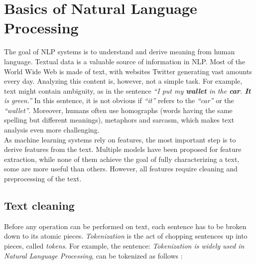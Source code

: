 \section{Basics of Natural Language Processing}
The goal of NLP systems is to understand and derive meaning from human language. Textual data is a valuable source of information in NLP.
Most of the World Wide Web is made of text, with websites  Twitter generating vast amounts every day. Analyzing this content is, however, not a simple task. For example, text might contain ambiguity, as in the sentence \emph{``I put my \textbf{wallet} in the  \textbf{car}.  \textbf{It} is green.''} In this sentence, it is not obvious if \emph{``it''} refers to the \emph{``car''} or the  \emph{``wallet''}. Moreover, humans often use homographs (words having the same spelling but different meanings), metaphors and sarcasm, which makes text analysis even more challenging.\\
As machine learning systems rely on features, the most important step is to derive features from the text. Multiple models have been proposed for feature extraction,  while none of them achieve the goal of fully characterizing a text, some are more useful than others.
%
However, all features require cleaning and preprocessing of the text. 


\subsection{Text cleaning }
Before any operation can be performed on text, each sentence has to be broken down to its atomic pieces. \emph{Tokenization} is the act of chopping sentences up into pieces, called \emph{tokens}.  For example, the sentence: \emph{Tokenization is widely used in Natural Language Processing}, can be tokenized as follows : \\

